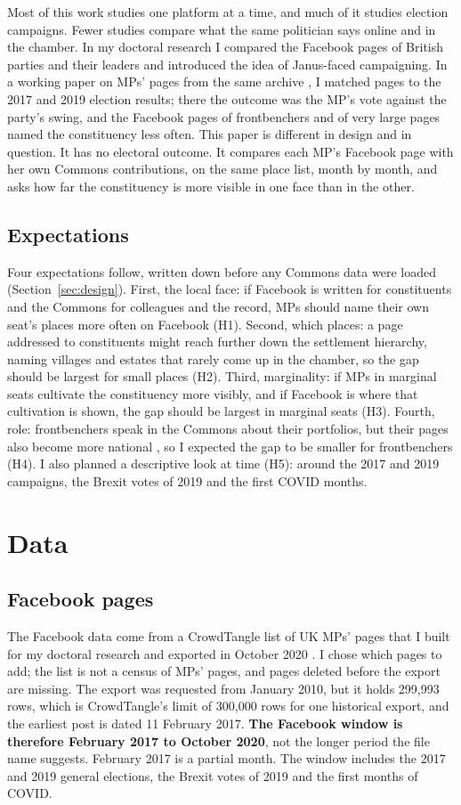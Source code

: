 \documentclass[11pt,a4paper]{article}
\begin{document}
Most of this work studies one platform at a time, and much of it studies election campaigns. Fewer studies compare what the same politician says online and in the chamber. In my doctoral research \citep{hotham2021} I compared the Facebook pages of British parties and their leaders and introduced the idea of Janus-faced campaigning. In a working paper on MPs' pages from the same archive \citep{hotham2027}, I matched pages to the 2017 and 2019 election results; there the outcome was the MP's vote against the party's swing, and the Facebook pages of frontbenchers and of very large pages named the constituency less often. This paper is different in design and in question. It has no electoral outcome. It compares each MP's Facebook page with her own Commons contributions, on the same place list, month by month, and asks how far the constituency is more visible in one face than in the other.

\subsection{Expectations}
Four expectations follow, written down before any Commons data were loaded (Section~\ref{sec:design}). First, the local face: if Facebook is written for constituents and the Commons for colleagues and the record, MPs should name their own seat's places more often on Facebook (H1). Second, which places: a page addressed to constituents might reach further down the settlement hierarchy, naming villages and estates that rarely come up in the chamber, so the gap should be largest for small places (H2). Third, marginality: if MPs in marginal seats cultivate the constituency more visibly, and if Facebook is where that cultivation is shown, the gap should be largest in marginal seats (H3). Fourth, role: frontbenchers speak in the Commons about their portfolios, but their pages also become more national \citep{hotham2027}, so I expected the gap to be smaller for frontbenchers (H4). I also planned a descriptive look at time (H5): around the 2017 and 2019 campaigns, the Brexit votes of 2019 and the first COVID months.

\section{Data}\label{sec:data}
\subsection{Facebook pages}
The Facebook data come from a CrowdTangle list of UK MPs' pages that I built for my doctoral research and exported in October 2020 \citep{crowdtangle2020,hotham2021}. I chose which pages to add; the list is not a census of MPs' pages, and pages deleted before the export are missing. The export was requested from January 2010, but it holds 299,993 rows, which is CrowdTangle's limit of 300,000 rows for one historical export, and the earliest post is dated 11 February 2017. \textbf{The Facebook window is therefore February 2017 to October 2020}, not the longer period the file name suggests. February 2017 is a partial month. The window includes the 2017 and 2019 general elections, the Brexit votes of 2019 and the first months of COVID.
\end{document}
